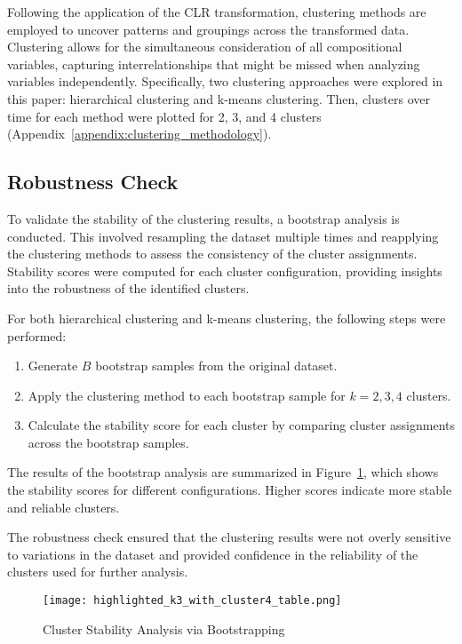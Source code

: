 \documentclass[a4paper,12pt]{article}
\begin{document}
Following the application of the CLR transformation, clustering methods are employed to uncover patterns and groupings across the transformed data. Clustering allows for the simultaneous consideration of all compositional variables, capturing interrelationships that might be missed when analyzing variables independently. Specifically, two clustering approaches were explored in this paper: hierarchical clustering and k-means clustering. Then, clusters over time for each method were plotted for 2, 3, and 4 clusters (Appendix~\ref{appendix:clustering_methodology}). 



\subsection{Robustness Check}

To validate the stability of the clustering results, a bootstrap analysis is conducted. This involved resampling the dataset multiple times and reapplying the clustering methods to assess the consistency of the cluster assignments. Stability scores were computed for each cluster configuration, providing insights into the robustness of the identified clusters.

For both hierarchical clustering and k-means clustering, the following steps were performed:
\begin{enumerate}
    \item Generate $B$ bootstrap samples from the original dataset.
    \item Apply the clustering method to each bootstrap sample for $k = 2, 3, 4$ clusters.
    \item Calculate the stability score for each cluster by comparing cluster assignments across the bootstrap samples.
\end{enumerate}

The results of the bootstrap analysis are summarized in Figure~\ref{fig:robustness_check}, which shows the stability scores for different configurations. Higher scores indicate more stable and reliable clusters.

The robustness check ensured that the clustering results were not overly sensitive to variations in the dataset and provided confidence in the reliability of the clusters used for further analysis.

\begin{figure} [H]
    \centering
    \texttt{[image: highlighted\_k3\_with\_cluster4\_table.png]}
    \caption{Cluster Stability Analysis via Bootstrapping}
    \label{fig:robustness_check}
\end{figure}
\end{document}
